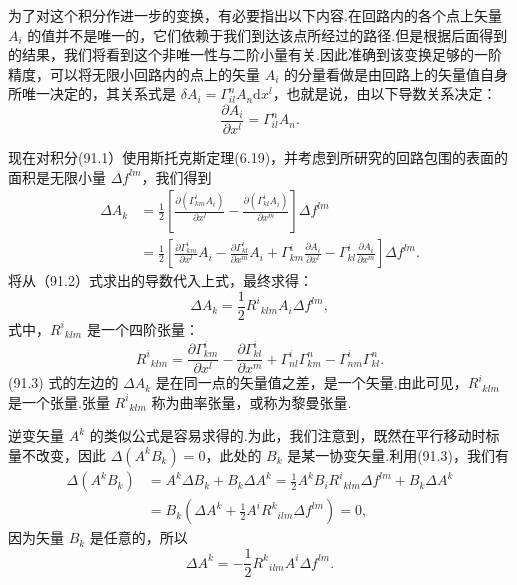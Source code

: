 为了对这个积分作进一步的变换，有必要指出以下内容.在回路内的各个点上矢量 $A_i$ 的值并不是唯一的，它们依赖于我们到达该点所经过的路径.但是根据后面得到的结果，我们将看到这个非唯一性与二阶小量有关.因此准确到该变换足够的一阶精度，可以将无限小回路内的点上的矢量 $A_i$ 的分量看做是由回路上的矢量值自身所唯一决定的，其关系式是 $\delta A_i=\Gamma^n_{il}A_n\mathrm{d}x^l$，也就是说，由以下导数关系决定：
\begin{equation}
  \frac{\partial A_i}{\partial x^l}=\Gamma^n_{il}A_n.
\end{equation}

现在对积分(91.1）使用斯托克斯定理(6.19)，并考虑到所研究的回路包围的表面的面积是无限小量 $\Delta f^{lm}$，我们得到
\begin{equation*}
\begin{aligned}
  \Delta A_k&=\frac{1}{2}\left[
  \frac{\partial(\Gamma^i_{km}A_i)}{\partial x^l}
  -\frac{\partial(\Gamma^i_{kl}A_i)}{\partial x^m}\right]\Delta f^{lm}\\
  &=\frac{1}{2}\left[
  \frac{\partial\Gamma^i_{km}}{\partial x^l}A_i
  -\frac{\partial\Gamma^i_{kl}}{\partial x^m}A_i
  +\Gamma^i_{km}\frac{\partial A_i}{\partial x^l}
  -\Gamma^i_{kl}\frac{\partial A_i}{\partial x^m}\right]\Delta f^{lm}.
\end{aligned}
\end{equation*}
将从（91.2）式求出的导数代入上式，最终求得：
\begin{equation}
  \Delta A_k=\frac{1}{2}R^i{}_{klm}A_i\Delta f^{lm},
\end{equation}
式中，$R^i{}_{klm}$ 是一个四阶张量：
\begin{equation}
  R^i{}_{klm}=\frac{\partial\Gamma^i_{km}}{\partial x^l}
  -\frac{\partial\Gamma^i_{kl}}{\partial x^m}
  +\Gamma^i_{nl}\Gamma^n_{km}-\Gamma^i_{nm}\Gamma^n_{kl}.
\end{equation}
(91.3) 式的左边的 $\Delta A_k$ 是在同一点的矢量值之差，是一个矢量.由此可见，$R^i{}_{klm}$ 是一个张量.张量 $R^i{}_{klm}$ 称为曲率张量，或称为黎曼张量.

逆变矢量 $A^k$ 的类似公式是容易求得的.为此，我们注意到，既然在平行移动时标量不改变，因此 $\Delta(A^kB_k)=0$，此处的 $B_k$ 是某一协变矢量.利用(91.3)，我们有
\begin{equation*}
\begin{aligned}
  \Delta(A^kB_k)&=A^k\Delta B_k+B_k\Delta A^k
  =\frac{1}{2}A^kB_iR^i{}_{klm}\Delta f^{lm}+B_k\Delta A^k\\
  &=B_k\left(\Delta A^k
  +\frac{1}{2}A^iR^k{}_{ilm}\Delta f^{lm}\right)=0,
\end{aligned}
\end{equation*}
因为矢量 $B_k$ 是任意的，所以
\begin{equation}
  \Delta A^k=-\frac{1}{2}R^k{}_{ilm}A^i\Delta f^{lm}.
\end{equation}

